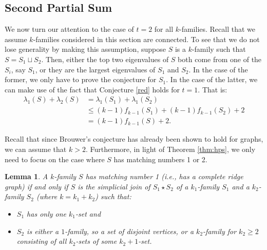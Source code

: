 \documentclass[11pt]{article}
\newtheorem{lm}{Lemma}
\begin{document}
\subsection{Second Partial Sum}\label{sec:second}

We now turn our attention to the case of $t = 2$ for all $k$-families. Recall that we assume $k$-families considered in this section are connected. To see that we do not lose generality by making this assumption, suppose $S$ is a $k$-family such that $S = S_1 \sqcup S_2$. Then, either the top two eigenvalues of $S$ both come from one of the $S_i$, say $S_1$, or they are the largest eigenvalues of $S_1$ and $S_2$. In the case of the former, we only have to prove the conjecture for $S_1$. In the case of the latter, we can make use of the fact that Conjecture \ref{red} holds for $t = 1$. That is:
\begin{align*}
\lambda_1(S) + \lambda_2(S) &= \lambda_1(S_1) + \lambda_1(S_2)\\
& \leq (k-1) f_{k - 1}(S_1) + (k - 1) f_{k - 1}(S_2) + 2\\
& = (k - 1)f_{k - 1}(S) + 2.
\end{align*}


Recall that since Brouwer's conjecture has already been shown to hold for graphs, we can assume that $k > 2$. Furthermore, in light of Theorem \ref{thm:hps}, we only need to focus on the case where $S$ has matching numbers 1 or 2.






\begin{lm}
A $k$-family $S$ has matching number 1 (i.e., has a complete ridge graph) if and only if $S$ is the simplicial join of $S_1 \star S_2$ of a $k_1$-family $S_1$ and a $k_2$-family $S_2$ (where $k = k_1 + k_2$) such that:
\begin{itemize}
\item $S_1$ has only one $k_1$-set and
\item $S_2$ is either a $1$-family, so a set of disjoint vertices, or a $k_2$-family for $k_2 \geq 2$ consisting of all $k_2$-sets of some $k_2 + 1$-set.
\end{itemize}
\end{lm}
\end{document}
